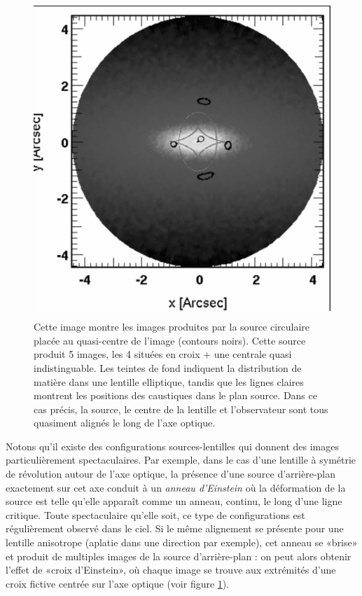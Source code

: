 \begin{figure}[htbp]
	\centering
		\includegraphics[height=12cm]{figs/SPL.png}
	\caption[Exemple de calcul de lentilles gravitationnelles]{Cette image montre les images produites par la source circulaire placée au quasi-centre de l'image (contours noirs). Cette source produit 5 images, les 4 situées en croix + une centrale quasi indistinguable. Les teintes de fond indiquent la distribution de matière dans une lentille elliptique, tandis que les lignes claires montrent les positions des caustiques dans le plan source. Dans ce cas précis, la source, le centre de la lentille et l'observateur sont tous quasiment alignés le long de l'axe optique.} 
	\label{f:SPL}
\end{figure}

Notons qu'il existe des configurations sources-lentilles qui donnent des images particulièrement spectaculaires. Par exemple, dans le cas d'une lentille à symétrie de révolution autour de l'axe optique, la présence d'une source d'arrière-plan exactement sur cet axe conduit à un \textit{anneau d'Einstein} où la déformation de la source est telle qu'elle apparaît comme un anneau, continu, le long d'une ligne critique. Toute spectaculaire qu'elle soit, ce type de configurations est régulièrement observé dans le ciel. Si le même alignement se présente pour une lentille anisotrope (aplatie dans une direction par exemple), cet anneau se «brise» et produit de multiples images de la source d'arrière-plan : on peut alors obtenir l'effet de «croix d'Einstein», où chaque image se trouve aux extrémités d'une croix fictive centrée sur l'axe optique (voir figure \ref{f:SPL}).


